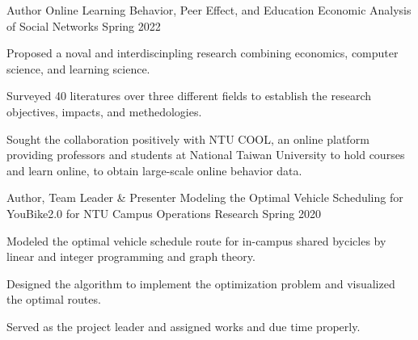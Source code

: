 

\begin{cventries}


    \cventry
    {Author}
    {Online Learning Behavior, Peer Effect, and Education}
    {Economic Analysis of Social Networks}
    {Spring 2022}
    {
        \begin{cvitems}
        \item Proposed a noval and interdiscinpling research combining economics,
            computer science, and learning science.
        \item Surveyed 40 literatures over three different fields to establish
            the research objectives, impacts, and methedologies.
        \item Sought the collaboration positively with NTU COOL, 
            an online platform providing professors and students 
            at National Taiwan University to hold courses and learn online,
            to obtain large-scale online behavior data.
        \end{cvitems}
    }

  \cventry
    {Author, Team Leader \& Presenter} %
    {Modeling the Optimal Vehicle Scheduling for YouBike2.0 for NTU Campus} %
    {Operations Research} %
    {Spring 2020} %
    {
      \begin{cvitems} %
      \item Modeled the optimal vehicle schedule route for in-campus shared bycicles
          by linear and integer programming and graph theory.
      \item Designed the algorithm to implement the optimization problem and
          visualized the optimal routes.
      \item {Served as the project leader and assigned works and due time properly.}
      \end{cvitems}
    }


\end{cventries}
